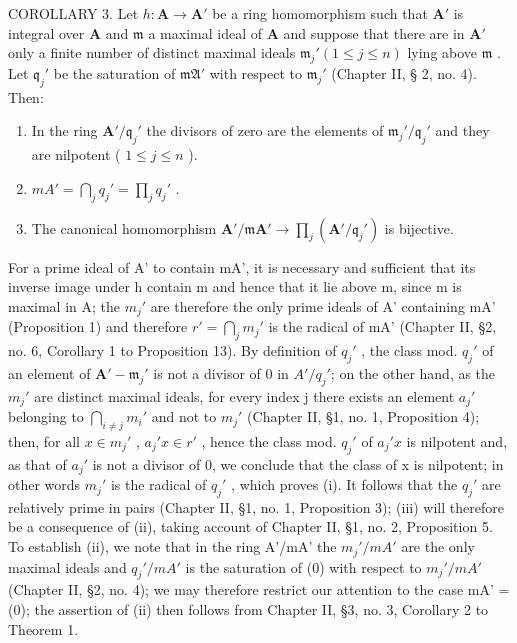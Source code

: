 COROLLARY 3. Let \(h: \mathbf{A} \to \mathbf{A}'\) be a ring homomorphism such that \(\mathbf{A}'\) is integral over \(\mathbf{A}\) and \(\mathfrak{m}\) a maximal ideal of \(\mathbf{A}\) and suppose that there are in \(\mathbf{A}'\) only a finite number of distinct maximal ideals \(\mathfrak{m}_j' (1 \leqslant j \leqslant n)\) lying above \(\mathfrak{m}\) . Let \(\mathfrak{q}_j'\) be the saturation of \(\mathfrak{mA}'\) with respect to \(\mathfrak{m}_j'\) (Chapter II, § 2, no. 4). Then:

\begin{enumerate}
\def\labelenumi{(\roman{enumi})}
\item
  In the ring \(\mathbf{A}' / \mathfrak{q}_j'\) the divisors of zero are the elements of \(\mathfrak{m}_j' / \mathfrak{q}_j'\) and they are nilpotent ( \(1 \leqslant j \leqslant n\) ).
\item
  \(mA' = \bigcap_{j} q_{j}' = \prod_{j} q_{j}'\) .
\item
  The canonical homomorphism \(\mathbf{A}' / \mathfrak{m}\mathbf{A}' \to \prod_j (\mathbf{A}' / \mathfrak{q}_j')\) is bijective.
\end{enumerate}

For a prime ideal of A' to contain mA', it is necessary and sufficient that its inverse image under h contain m and hence that it lie above m, since m is maximal in A; the \(m_{j}'\) are therefore the only prime ideals of A' containing mA' (Proposition 1) and therefore \(r' = \bigcap_{j} m_{j}'\) is the radical of mA' (Chapter II, §2, no. 6, Corollary 1 to Proposition 13). By definition of \(q_{j}'\) , the class mod. \(q_{j}'\) of an element of \(\mathbf{A}' - \mathfrak{m}_{j}'\) is not a divisor of 0 in \(A'/q_{j}'\); on the other hand, as the \(m_{j}'\) are distinct maximal ideals, for every index j there exists an element \(a_{j}'\) belonging to \(\bigcap_{i \neq j} m_{i}'\) and not to \(m_{j}'\) (Chapter II, §1, no. 1, Proposition 4); then, for all \(x \in m_{j}'\) , \(a_{j}'x \in r'\) , hence the class mod. \(q_{j}'\) of \(a_{j}'x\) is nilpotent and, as that of \(a_{j}'\) is not a divisor of 0, we conclude that the class of x is nilpotent; in other words \(m_{j}'\) is the radical of \(q_{j}'\) , which proves (i). It follows that the \(q_{j}'\) are relatively prime in pairs (Chapter II, §1, no. 1, Proposition 3); (iii) will therefore be a consequence of (ii), taking account of Chapter II, §1, no. 2, Proposition 5. To establish (ii), we note that in the ring A'/mA' the \(m_{j}'/mA'\) are the only maximal ideals and \(q_{j}'/mA'\) is the saturation of (0) with respect to \(m_{j}'/mA'\) (Chapter II, §2, no. 4); we may therefore restrict our attention to the case mA' = (0); the assertion of (ii) then follows from Chapter II, §3, no. 3, Corollary 2 to Theorem 1.

